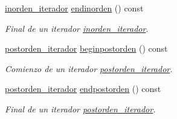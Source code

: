\begin{DoxyCompactItemize}
\hyperlink{classArbolBinario_1_1inorden__iterador}{inorden\+\_\+iterador} \hyperlink{classArbolBinario_a62a0048bb6d35947409496b55b5bd303}{endinorden} () const
\begin{DoxyCompactList}\small\item\em Final de un iterador \hyperlink{classArbolBinario_1_1inorden__iterador}{inorden\+\_\+iterador}. \end{DoxyCompactList}\item 
\hyperlink{classArbolBinario_1_1postorden__iterador}{postorden\+\_\+iterador} \hyperlink{classArbolBinario_a1bcccd1312f5127ad811c90dad94931d}{beginpostorden} () const
\begin{DoxyCompactList}\small\item\em Comienzo de un iterador \hyperlink{classArbolBinario_1_1postorden__iterador}{postorden\+\_\+iterador}. \end{DoxyCompactList}\item 
\hyperlink{classArbolBinario_1_1postorden__iterador}{postorden\+\_\+iterador} \hyperlink{classArbolBinario_ad4ead2ad6b0e81f185fb540184a15bdb}{endpostorden} () const
\begin{DoxyCompactList}\small\item\em Final de un iterador \hyperlink{classArbolBinario_1_1postorden__iterador}{postorden\+\_\+iterador}. \end{DoxyCompactList}\end{DoxyCompactItemize}
